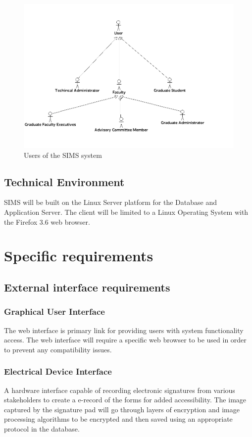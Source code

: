 \documentclass{journal}
\begin{document}
\begin{figure}[!h]
\begin{center}
\includegraphics[width=468px]{diagrams/use_cases/UserHeirachy_uc} \caption{ Users of the SIMS system } \label{fig:Users}

\end{center}
\end{figure}



\subsection{Technical Environment}

SIMS will be built on the Linux Server platform for the Database and Application Server. The client will be limited to a Linux Operating System with the Firefox 3.6 web browser.  

\section{Specific requirements}
\subsection{External interface requirements}
\subsubsection{ Graphical User Interface }
The web interface is primary link for providing users with system functionality access. The web interface will require a specific web browser to be used in order to prevent any compatibility issues. 

\subsubsection{ Electrical Device Interface }
A hardware interface capable of recording electronic signatures from various stakeholders to create a e-record of the forms for added accessibility. The image captured by the signature pad will go through layers of encryption and image processing algorithms to be encrypted and then saved using an appropriate protocol in the database.
\end{document}
